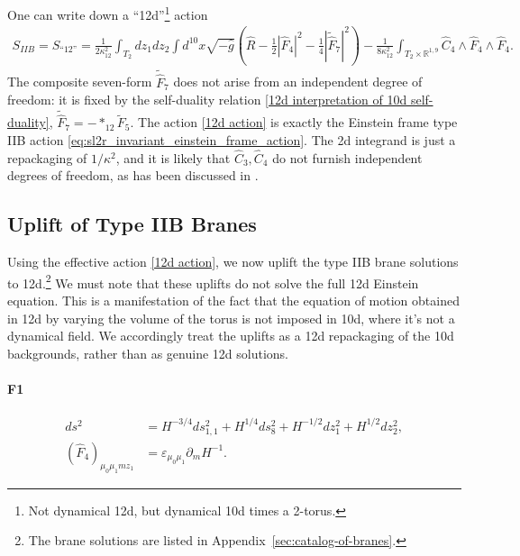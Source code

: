 One can write down a ``12d''\footnote{
Not dynamical 12d, but dynamical 10d times a 2-torus.
}
action
\begin{equation}
\begin{aligned}
S_{IIB}=
S_{\text{``12''}}
= \frac{1}{2\kappa_{12}^2}\int_{T_2}dz_1 dz_2\int d^{10}x
\sqrt{-\widehat{g}}
\left(
\widehat{R} - \frac{1}{2}|\widehat F_4|^2-\frac{1}{4}|\widetilde{\widehat{F}}_7|^2
\right)-\frac{1}{8\kappa_{12}^2}\int_{T_2\times \mathbb{R}^{1,9}}\widehat{C}_4\wedge \widehat{F}_4\wedge \widehat{F}_4.
\end{aligned}
\label{12d action}
\end{equation}
The composite seven-form $\widetilde{\widehat{F}}_7$ does not arise from an independent degree of freedom: it is fixed by the self-duality relation \eqref{12d interpretation of 10d self-duality}, $\widetilde{\widehat{F}}_7 = -*_{12}\tilde F_5$. 
The action \eqref{12d action} is exactly the Einstein frame type IIB action \eqref{eq:sl2r_invariant_einstein_frame_action}.
The 2d integrand is just a repackaging of $1/\kappa^2$, and it is likely that $\widehat C_3, \widehat C_4$ do not furnish independent degrees of freedom, as has been discussed in \cite{Tseytlin:1996ne}.

\subsection{Uplift of Type IIB Branes}
Using the effective action \eqref{12d action}, we now uplift the type IIB brane solutions to 12d.\footnote{The brane solutions are listed in Appendix~\ref{sec:catalog-of-branes}.}
We must note that these uplifts do not solve the full 12d Einstein equation.
This is a manifestation of the fact that the equation of motion obtained in 12d by varying the volume of the torus is not imposed in 10d, where it's not a dynamical field.
We accordingly treat the uplifts as a 12d repackaging of the 10d backgrounds, rather than as genuine 12d solutions.

\paragraph{F1}
\begin{equation}
\begin{aligned}
ds^2
&= H^{-3/4}ds_{1,1}^2
+ H^{1/4}ds_8^2
+H^{-1/2}dz_1^2
+H^{1/2}dz_2^2,\\
(\widehat{F}_4)_{\mu_0 \mu_1 m z_1}
&= \varepsilon_{\mu_0 \mu_1}\partial_m H^{-1}.
\end{aligned}
\end{equation}

